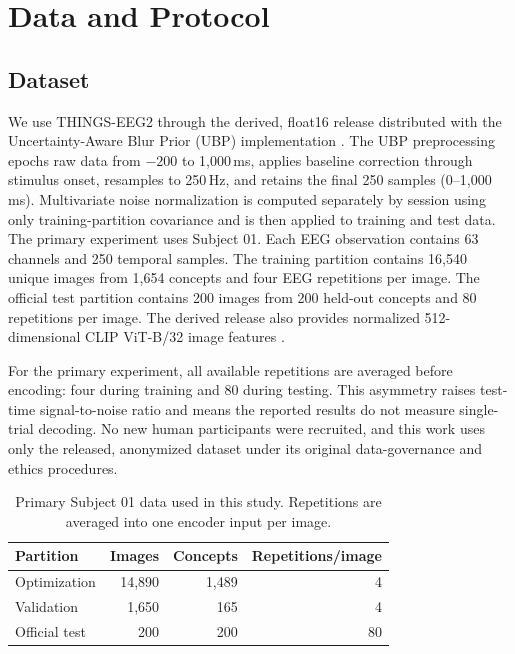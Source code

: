 \documentclass[10pt]{article}
\begin{document}
\section{Data and Protocol}

\subsection{Dataset}

We use THINGS-EEG2 \cite{gifford2022things_eeg2} through the derived,
float16 release distributed with the Uncertainty-Aware Blur Prior (UBP)
implementation \cite{wu2025ubp}. The UBP preprocessing epochs raw data from
$-200$ to 1,000\,ms, applies baseline correction through stimulus onset,
resamples to 250\,Hz, and retains the final 250 samples (0--1,000\,ms).
Multivariate noise normalization is computed separately by session using only
training-partition covariance and is then applied to training and test data.
The primary experiment uses Subject 01. Each EEG observation contains 63
channels and 250 temporal samples. The training partition contains 16,540
unique images from 1,654 concepts and four EEG repetitions per image. The
official test partition contains 200 images from 200 held-out concepts and 80
repetitions per image. The derived release also provides normalized
512-dimensional CLIP ViT-B/32 image features \cite{radford2021clip}.

For the primary experiment, all available repetitions are averaged before
encoding: four during training and 80 during testing. This asymmetry raises
test-time signal-to-noise ratio and means the reported results do not measure
single-trial decoding. No new human participants were recruited, and this work
uses only the released, anonymized dataset under its original data-governance
and ethics procedures.

\begin{table}[t]
  \centering
  \caption{Primary Subject 01 data used in this study. Repetitions are averaged
  into one encoder input per image.}
  \label{tab:data}
  \begin{tabular}{lrrr}
    \toprule
    Partition & Images & Concepts & Repetitions/image\\
    \midrule
    Optimization & 14,890 & 1,489 & 4\\
    Validation & 1,650 & 165 & 4\\
    Official test & 200 & 200 & 80\\
    \bottomrule
  \end{tabular}
\end{table}
\end{document}
